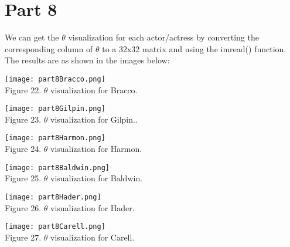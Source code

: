 \documentclass{article}
\begin{document}
\newpage
\section*{Part 8}
We can get the $\theta$ visualization for each actor/actress by converting the corresponding column of $\theta$ to a 32x32 matrix and using the imread() function. The results are as shown in the images below:
\begin{center}
\texttt{[image: part8Bracco.png]}\\
Figure 22. $\theta$ visualization for Bracco.
\end{center}

\begin{center}
\texttt{[image: part8Gilpin.png]}\\
Figure 23. $\theta$ visualization for Gilpin..
\end{center}

\begin{center}
\texttt{[image: part8Harmon.png]}\\
Figure 24. $\theta$ visualization for Harmon.
\end{center}

\begin{center}
\texttt{[image: part8Baldwin.png]}\\
Figure 25. $\theta$ visualization for Baldwin.
\end{center}

\begin{center}
\texttt{[image: part8Hader.png]}\\
Figure 26. $\theta$ visualization for Hader.
\end{center}

\begin{center}
\texttt{[image: part8Carell.png]}\\
Figure 27. $\theta$ visualization for Carell.
\end{center}
\end{document}
